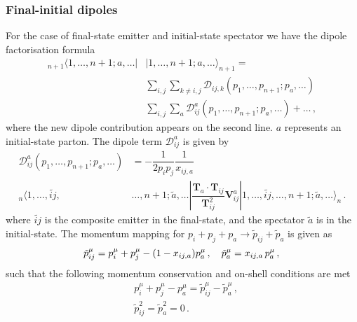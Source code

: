 \documentclass[main.tex]{subfiles}
\begin{document}
        \subsubsection{Final-initial dipoles}
        For the case of final-state emitter and initial-state
        spectator we have the dipole factorisation formula
        \begin{equation}\label{eqn:FI_factorisation}
            \begin{split}
                {}_{n+1}\langle 1, \ldots, n+1; a, \ldots |&| 1, \ldots, n+1; a, \ldots \rangle_{n+1} = \\
                &\sum_{i,j}\sum_{k\neq i,j} \mathcal{D}_{ij,k}(p_{1},\ldots,p_{n+1};p_{a},\ldots) \\
                &\sum_{i,j}\sum_{a} \mathcal{D}_{ij}^{a}(p_{1},\ldots,p_{n+1};p_{a},\ldots) + \ldots \, ,
            \end{split}
        \end{equation}
        where the new dipole contribution appears on the second line. $a$ represents an initial-state parton.
        The dipole term $\mathcal{D}_{ij}^{a}$ is given by
        \begin{equation}\label{eqn:D_aij}
            \begin{split}
                \mathcal{D}_{ij}^{a}(p_{1}, \ldots, p_{n+1}; p_{a}, \ldots) &= -\dfrac{1}{2p_{i}p_{j}} \dfrac{1}{x_{ij,a}} \\
                {}_{n} \langle 1, \ldots, \widetilde{ij}, &\ldots, n+1; \tilde{a}, \ldots | \dfrac{\boldsymbol{T}_{a} \cdot \boldsymbol{T}_{ij}}{\boldsymbol{T}_{ij}^{2}} \boldsymbol{V}_{ij}^{a} | 1, \ldots, \widetilde{ij}, \ldots, n+1; \tilde{a} , \ldots \rangle_{n} \, .
            \end{split}
        \end{equation}
        where $\widetilde{ij}$ is the composite emitter in the
        final-state, and the spectator $\tilde{a}$ is in the initial-state.
        The momentum mapping for $p_{i} + p_{j} + p_{a} \rightarrow \tilde{p}_{ij} + \tilde{p}_{a}$ is given as
        \begin{equation}\label{eqn:FI_mapping}
            \tilde{p}_{ij}^{\mu} = p_{i}^{\mu} + p_{j}^{\mu} - (1-x_{ij,a})p_{a}^{\mu} \, , \quad \tilde{p}_{a}^{\mu} = x_{ij,a} \, p_{a}^{\mu} \, , \\
        \end{equation}
        such that the following momentum conservation and on-shell conditions are met
        \begin{equation}\label{eqn:FI_mapping_conditions}
            \begin{split}
                &p_{i}^{\mu} + p_{j}^{\mu} - p_{a}^{\mu} = \tilde{p}_{ij}^{\mu} - \tilde{p}_{a}^{\mu} \, , \\
                &\tilde{p}_{ij}^{2} = \tilde{p}_{a}^{2} = 0 \, .
            \end{split}
        \end{equation}
\end{document}
